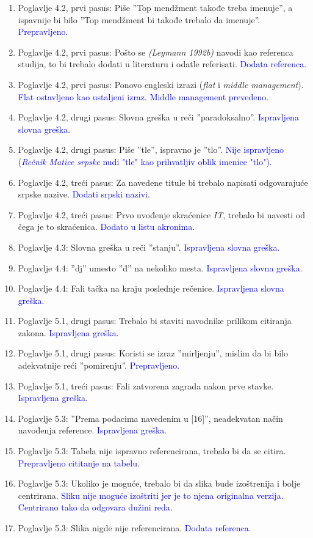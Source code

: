 \documentclass[a4paper]{report}
\newcommand{\odgovor}[1]{\textcolor{blue}{#1}}
\begin{document}
\begin{enumerate}
\item Poglavlje 4.2, prvi pasus: Piše ''Top mendžment takođe treba imenuje'', a ispavnije bi bilo ''Top mendžment bi takođe trebalo da imenuje''. \odgovor{Prepravljeno.}
\item Poglavlje 4.2, prvi pasus: Pošto se \textit{(Leymann 1992b)} navodi kao referenca studija, to bi trebalo dodati u literaturu i odatle referisati. \odgovor{Dodata referenca.}
\item Poglavlje 4.2, prvi pasus: Ponovo engleski izrazi (\textit{flat} i \textit{middle management}). \odgovor{Flat ostavljeno kao ustaljeni izraz. Middle management prevedeno.}
\item Poglavlje 4.2, drugi pasus: Slovna greška u reči ''paradoksalno''. \odgovor{Ispravljena slovna greška.}
\item Poglavlje 4.2, drugi pasus: Piše ''tle'', ispravno je ''tlo''. \odgovor{Nije ispravljeno (\textit{Rečnik Matice srpske} nudi "tle" kao prihvatljiv oblik imenice "tlo").}
\item Poglavlje 4.2, treći pasus: Za navedene titule bi trebalo napisati odgovarajuće srpske nazive. \odgovor{Dodati srpski nazivi.}
\item Poglavlje 4.2, treći pasus: Prvo uvođenje skraćenice \textit{IT}, trebalo bi navesti od čega je to skraćenica. \odgovor{Dodato u listu akronima.}
\item Poglavlje 4.3: Slovna greška u reči ''stanju''. \odgovor{Ispravljena slovna greška.}
\item Poglavlje 4.4: ''dj'' umesto ''đ'' na nekoliko mesta. \odgovor{Ispravljena slovna greška.}
\item Poglavlje 4.4: Fali tačka na kraju poslednje rečenice. \odgovor{Ispravljena slovna greška.}
\item Poglavlje 5.1, drugi pasus: Trebalo bi staviti navodnike prilikom citiranja zakona. \odgovor{Ispravljena greška.}
\item Poglavlje 5.1, drugi pasus: Koristi se izraz ''mirljenju'', mislim da bi bilo adekvatnije reći ''pomirenju''. \odgovor{Prepravljeno.}
\item Poglavlje 5.1, treći pasus: Fali zatvorena zagrada nakon prve stavke. \odgovor{Ispravljena greška.}
\item Poglavlje 5.3: ''Prema podacima navedenim u [16]'', neadekvatan način navođenja reference. \odgovor{Ispravljena greška.}
\item Poglavlje 5.3: Tabela nije ispravno referencirana, trebalo bi da se citira. \odgovor{Prepravljeno cititanje na tabelu.}
\item Poglavlje 5.3: Ukoliko je moguće, trebalo bi da slika bude izoštrenija i bolje centrirana. \odgovor{Sliku nije moguće izoštriti jer je to njena originalna verzija. Centrirano tako da odgovara dužini reda.}
\item Poglavlje 5.3: Slika nigde nije referencirana. \odgovor{Dodata referenca.}
\end{enumerate}
\end{document}
